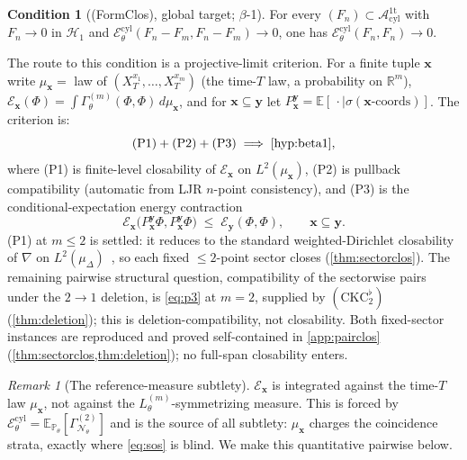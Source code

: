 \documentclass[reqno,final,11pt]{amsart}
\theoremstyle{plain}
\theoremstyle{definition}
\newtheorem{hypothesis}[theorem]{Condition}
\theoremstyle{remark}
\newtheorem{remark}[theorem]{Remark}
\newcommand{\R}{\mathbb R}
\newcommand{\E}{\mathbb E}
\newcommand{\Prob}{\mathbb P}
\newcommand{\cA}{\mathcal A}
\newcommand{\cE}{\mathcal E}
\newcommand{\cN}{\mathcal N}
\newcommand{\GamN}{\Gamma^{(2)}_{\cN_\theta}}
\newcommand{\Lth}[1]{L^{(#1)}_{\theta}}
\newcommand{\Pth}{\Prob_{\theta}}
\newcommand{\Hone}{\mathcal H_{1}}
\newcommand{\Aone}{\cA^{\mathrm{1t}}_{\mathrm{cyl}}}
\newcommand{\muD}{\mu_{\Delta}}
\newcommand{\Ecyl}{\cE^{\mathrm{cyl}}_{\theta}}
\begin{document}
\begin{hypothesis}[\textnormal{(FormClos)}, global target; $\beta$-1]
\label{hyp:beta1}
For every $(F_n)\subset\Aone$ with $F_n\to0$ in $\Hone$ and
$\Ecyl(F_n-F_m,F_n-F_m)\to0$, one has $\Ecyl(F_n,F_n)\to0$.
\end{hypothesis}

The route to this condition is a projective-limit criterion.
For a finite tuple $\mathbf x$ write $\mu_{\mathbf x}=$ law of
$(X^{x_1}_T,\dots,X^{x_m}_T)$ (the time-$T$ law, a probability on
$\R^m$), $\cE_{\mathbf x}(\Phi)=\int\Gamma^{(m)}_\theta(\Phi,\Phi)\,d\mu_{\mathbf x}$,
and for $\mathbf x\subseteq\mathbf y$ let $P^{\mathbf y}_{\mathbf x}=
\E[\,\cdot\mid\sigma(\text{$\mathbf x$-coords})]$. The criterion is:
\begin{equation}\label{eq:criterion}
  \text{(P1)}+\text{(P2)}+\text{(P3)}\;\Longrightarrow\;\text{\cref{hyp:beta1}},
\end{equation}
where \textnormal{(P1)} is finite-level closability of $\cE_{\mathbf x}$ on
$L^2(\mu_{\mathbf x})$, \textnormal{(P2)} is pullback compatibility
(automatic from LJR $n$-point consistency), and
\textnormal{(P3)} is the conditional-expectation energy contraction
\begin{equation}\label{eq:p3}
  \cE_{\mathbf x}\bigl(P^{\mathbf y}_{\mathbf x}\Phi,P^{\mathbf y}_{\mathbf x}\Phi\bigr)
  \;\le\;\cE_{\mathbf y}(\Phi,\Phi),\qquad \mathbf x\subseteq\mathbf y .
\end{equation}
(P1) at $m\le2$ is settled: it reduces to the standard weighted-Dirichlet
closability of $\nabla$ on $L^2(\muD)$~\citep{FOT}, so each fixed $\le2$-point
sector closes (\cref{thm:sectorclos}). The remaining pairwise structural question,
compatibility of the sectorwise pairs under the $2\to1$ deletion, is
\eqref{eq:p3} at $m=2$, supplied by $(\mathrm{CKC}_2^{\flat})$
(\cref{thm:deletion}); this is deletion-compatibility, not closability. Both
fixed-sector instances are reproduced and proved self-contained in
\cref{app:pairclos} (\cref{thm:sectorclos,thm:deletion}); no full-span closability enters.

\begin{remark}[The reference-measure subtlety]\label{rem:reference-measure}
$\cE_{\mathbf x}$ is integrated against the time-$T$ law
$\mu_{\mathbf x}$, not against the $\Lth{m}$-symmetrizing measure. This is
forced by $\Ecyl=\E_{\Pth}[\GamN]$ and is the source of all subtlety:
$\mu_{\mathbf x}$ charges the coincidence strata, exactly where
\eqref{eq:sos} is blind. We make this quantitative pairwise below.
\end{remark}
\end{document}
